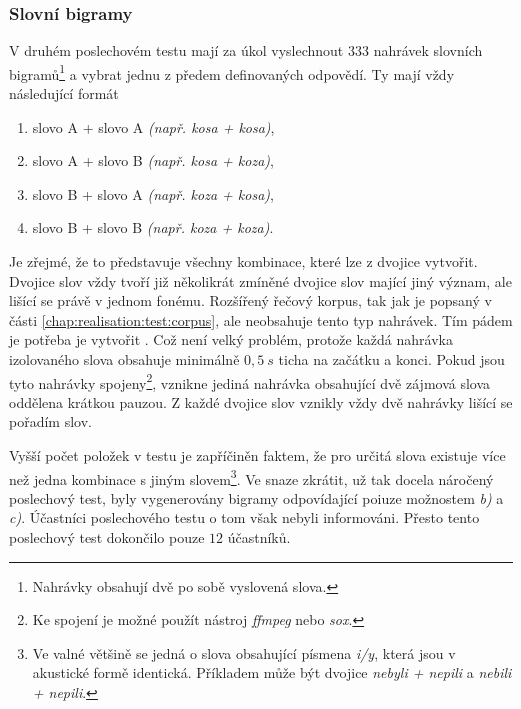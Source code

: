 \subsubsection{Slovní bigramy}

V druhém poslechovém testu mají za úkol vyslechnout $333$ nahrávek slovních bigramů\footnote{Nahrávky obsahují dvě po sobě vyslovená slova.} a vybrat jednu z předem definovaných odpovědí. Ty mají vždy následující formát

\begin{enumerate}[label=\alph*)]
  \item slovo A + slovo A \textit{(např. kosa + kosa)},
  \item slovo A + slovo B \textit{(např. kosa + koza)},
  \item slovo B + slovo A \textit{(např. koza + kosa)},
  \item slovo B + slovo B \textit{(např. koza + koza)}.
\end{enumerate}

\noindent Je zřejmé, že to představuje všechny kombinace, které lze z dvojice vytvořit. Dvojice slov vždy tvoří již několikrát zmíněné dvojice slov mající jiný význam, ale lišící se právě v jednom fonému. Rozšířený řečový korpus, tak jak je popsaný v části \ref{chap:realisation:test:corpus}, ale neobsahuje tento typ nahrávek. Tím pádem je potřeba je vytvořit . Což není velký problém, protože každá nahrávka izolovaného slova obsahuje minimálně $0,5\ s$ ticha na začátku a konci. Pokud jsou tyto nahrávky spojeny\footnote{Ke spojení je možné použít nástroj \textit{ffmpeg} nebo \textit{sox}.}, vznikne jediná nahrávka obsahující dvě zájmová slova oddělena krátkou pauzou. Z každé dvojice slov vznikly vždy dvě nahrávky lišící se pořadím slov.

Vyšší počet položek v testu je zapříčiněn faktem, že pro určitá slova existuje více než jedna kombinace s jiným slovem\footnote{Ve valné většině se jedná o slova obsahující písmena \textit{i/y}, která jsou v akustické formě identická. Příkladem může být dvojice \textit{nebyli + nepili} a \textit{nebili + nepili}.}. Ve snaze zkrátit, už tak docela náročený poslechový test, byly vygenerovány bigramy odpovídající poiuze možnostem \textit{b)} a \textit{c)}. Účastníci poslechového testu o tom však nebyli informováni. Přesto tento poslechový test dokončilo pouze $12$ účastníků.

